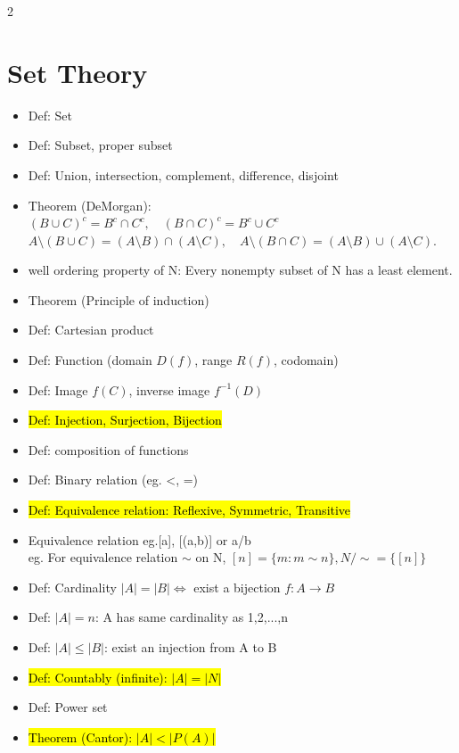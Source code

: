\documentclass[a4paper,10pt]{article}
\begin{document}
\begin{multicols}{2}
\small


\section*{Set Theory}
\begin{itemize}
    \item Def: Set
    \item Def: Subset, proper subset
    \item Def: Union, intersection, complement, difference, disjoint
    \item Theorem (DeMorgan):\\ $(B \cup C)^c = B^c \cap C^c, \quad (B \cap C)^c = B^c \cup C^c$\\
    $A \setminus (B \cup C) = (A \setminus B) \cap (A \setminus C), \quad 
    A \setminus (B \cap C) = (A \setminus B) \cup (A \setminus C).$
    \item well ordering property of N: Every nonempty subset of N has a least element.
    \item Theorem (Principle of induction)
    \item Def: Cartesian product
    \item Def: Function (domain $D(f)$, range $R(f)$, codomain)
    \item Def: Image $f(C)$, inverse image $f^{-1}(D)$
    \item \hl{Def: Injection, Surjection, Bijection}
    \item Def: composition of functions
    \item Def: Binary relation (eg. <, =)
    \item \hl{Def: Equivalence relation: Reflexive, Symmetric, Transitive}
    \item Equivalence relation eg.[a], [(a,b)] or a/b\\
    eg. For equivalence relation $\sim$ on N, $[n]=\{m:m\sim n\},N/\sim=\{[n]\}$
    \item Def: Cardinality $|A|=|B|\Leftrightarrow$ exist a bijection $f:A\to B$
    \item Def: $|A|=n$: A has same cardinality as {1,2,...,n}
    \item Def: $|A|\le |B|$: exist an injection from A to B
    \item \hl{Def: Countably (infinite): $|A|=|N|$}
    \item Def: Power set
    \item \hl{Theorem (Cantor): $|A|<|P(A)|$}
    

\end{itemize}
\end{multicols}
\end{document}
